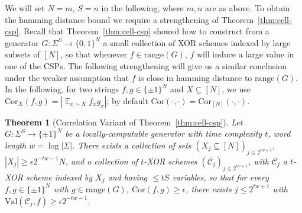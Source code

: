 \documentclass[11pt]{article}
\newtheorem{theorem}{Theorem}
\newcommand{\B}{\{0,1\}}
\newcommand{\rng}{\mathrm{range}}
\newcommand{\E}{\mathop{\mathbb{E}}}
\newcommand{\Opt}{\mathrm{OPT}}
\newcommand{\N}{[N]}
\begin{document}
We will set $N=m$, $S=n$ in the following, where $m,n$ are as above. To obtain the hamming distance bound we require a strengthening of Theorem~\ref{thm:cell-csp}. Recall that Theorem~\ref{thm:cell-csp} showed how to construct from a generator $G:\Sigma^S \to \B^N$ a small collection of XOR schemes indexed by large subsets of $\N$, so that whenever $f \in \rng(G)$, $f$ will induce a large value in one of the CSPs. The following strengthening will give us a similar conclusion under the weaker assumption that $f$ is close in hamming distance to $\rng(G)$. In the following, for two strings $f,g\in \{\pm 1\}^N$ and $X \subseteq \N$, we use $\mathrm{Cor}_X(f,g) = |\E_{x \sim X} f_x g_x|$; by default $\mathrm{Cor}(\cdot,\cdot)=\mathrm{Cor}_{\N}(\cdot, \cdot)$. 
\begin{theorem}[Correlation Variant of Theorem~\ref{thm:cell-csp}]\label{thm:cell-csp-correlation}
Let $G: \Sigma^S \to \{\pm 1\}^{N}$ be a locally-computable generator with time complexity $t$, word length $w= \log |\Sigma|$. There exists a collection of sets $(X_j \subseteq \N)_{j \leq 2^{tw + 1}}$, $|X_j| \geq \epsilon2^{-tw-1}N$, and a collection of $t$-XOR schemes $(\mathcal{C}_j)_{j \leq 2^{tw + 1}}$, with $\mathcal{C}_j$ a $t$-XOR scheme indexed by $X_j$ and having $\leq tS$ variables, so that for every $f,g\in \{\pm 1\}^N$ with $g\in \rng(G)$, $\mathrm{Cor}(f,g) \geq \epsilon$, there exists $j \leq 2^{tw + 1}$ with $\mathrm{Val}(\mathcal{C}_j,f) \geq \epsilon2^{-tw-1}$.
\end{theorem}
\end{document}
